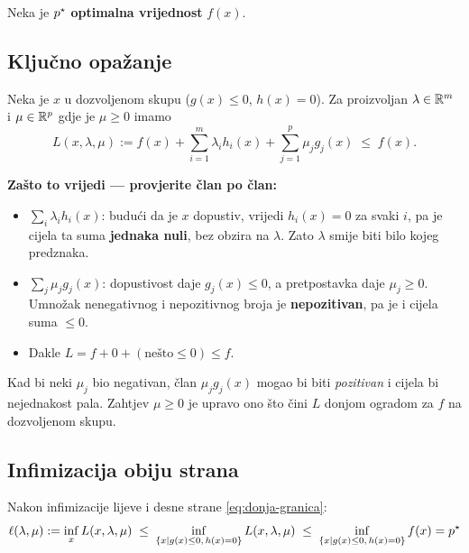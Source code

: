 Neka je $p^{\star}$ \textbf{optimalna vrijednost} $f(x)$.

\subsection{Ključno opažanje}

\begin{teorem}
Neka je $x$ u dozvoljenom skupu ($g(x) \le 0$, $h(x) = 0$). Za proizvoljan
$\lambda \in \mathbb{R}^m$ i $\mu \in \mathbb{R}^p$ gdje je $\mu \ge 0$ imamo
\begin{equation}
\label{eq:donja-granica}
L(x,\lambda,\mu) := f(x) + \sum_{i=1}^{m}\lambda_i h_i(x)
                        + \sum_{j=1}^{p}\mu_j g_j(x) \;\le\; f(x).
\end{equation}
\end{teorem}

\textbf{Zašto to vrijedi --- provjerite član po član:}

\begin{itemize}
  \item $\sum_i \lambda_i h_i(x)$: budući da je $x$ dopustiv, vrijedi
        $h_i(x) = 0$ za svaki $i$, pa je cijela ta suma \textbf{jednaka nuli},
        bez obzira na $\lambda$. Zato $\lambda$ smije biti bilo kojeg predznaka.
  \item $\sum_j \mu_j g_j(x)$: dopustivost daje $g_j(x) \le 0$, a
        pretpostavka daje $\mu_j \ge 0$. Umnožak nenegativnog i nepozitivnog
        broja je \textbf{nepozitivan}, pa je i cijela suma $\le 0$.
  \item Dakle $L = f + 0 + (\text{nešto} \le 0) \le f$. \checkmark
\end{itemize}

\begin{napomena}
Kad bi neki $\mu_j$ bio negativan, član $\mu_jg_j(x)$ mogao bi biti
\emph{pozitivan} i cijela bi nejednakost pala. Zahtjev $\mu \ge 0$ je upravo
ono što čini $L$ donjom ogradom za $f$ na dozvoljenom skupu.
\end{napomena}

\subsection{Infimizacija obiju strana}

Nakon infimizacije lijeve i desne strane \eqref{eq:donja-granica}:
\begin{equation}
\label{eq:lanac}
\ell(\lambda,\mu) := \inf_x L(x,\lambda,\mu)
\;\le\; \inf_{\{x \mid g(x)\le0,\,h(x)=0\}} L(x,\lambda,\mu)
\;\le\; \inf_{\{x \mid g(x)\le0,\,h(x)=0\}} f(x) = p^{\star}
\end{equation}

